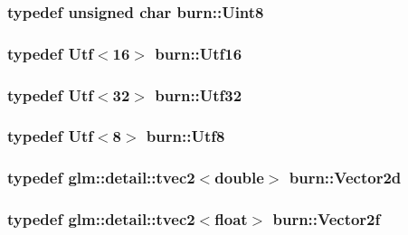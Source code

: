 \hypertarget{namespaceburn_a184b59a040b9ef0ce2833c36dcea7656}{
\subsubsection[{Uint8}]{\setlength{\rightskip}{0pt plus 5cm}typedef unsigned char {\bf burn\-::\-Uint8}}}\label{namespaceburn_a184b59a040b9ef0ce2833c36dcea7656}
\hypertarget{namespaceburn_aa13e1efa328b40c8e3c8efcdbb5fe10c}{
\subsubsection[{Utf16}]{\setlength{\rightskip}{0pt plus 5cm}typedef {\bf Utf}$<$16$>$ {\bf burn\-::\-Utf16}}}\label{namespaceburn_aa13e1efa328b40c8e3c8efcdbb5fe10c}
\hypertarget{namespaceburn_ac07ce0025d1a75fd2f42073a2ce1eded}{
\subsubsection[{Utf32}]{\setlength{\rightskip}{0pt plus 5cm}typedef {\bf Utf}$<$32$>$ {\bf burn\-::\-Utf32}}}\label{namespaceburn_ac07ce0025d1a75fd2f42073a2ce1eded}
\hypertarget{namespaceburn_aeaf9e2b325886400d72e29ffa4fc0f5d}{
\subsubsection[{Utf8}]{\setlength{\rightskip}{0pt plus 5cm}typedef {\bf Utf}$<$8$>$ {\bf burn\-::\-Utf8}}}\label{namespaceburn_aeaf9e2b325886400d72e29ffa4fc0f5d}
\hypertarget{namespaceburn_a8ae93c5e897bdb83b7df8536308fb0e0}{
\subsubsection[{Vector2d}]{\setlength{\rightskip}{0pt plus 5cm}typedef glm\-::detail\-::tvec2$<$double$>$ {\bf burn\-::\-Vector2d}}}\label{namespaceburn_a8ae93c5e897bdb83b7df8536308fb0e0}
\hypertarget{namespaceburn_af5ed9eb70cbf0fb572098ff43e146a0a}{
\subsubsection[{Vector2f}]{\setlength{\rightskip}{0pt plus 5cm}typedef glm\-::detail\-::tvec2$<$float$>$ {\bf burn\-::\-Vector2f}}}\label{namespaceburn_af5ed9eb70cbf0fb572098ff43e146a0a}
